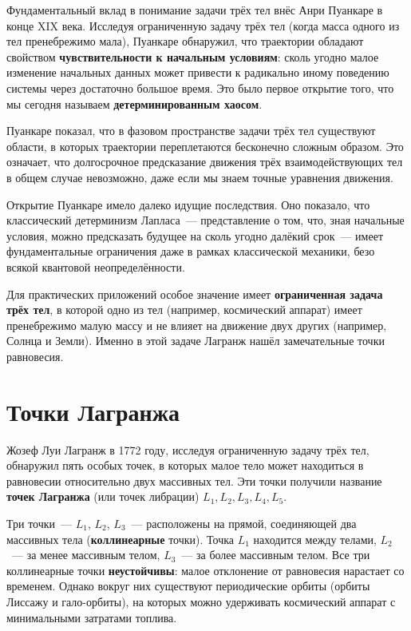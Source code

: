 \documentclass[12pt,a4paper]{article}
\begin{document}
Фундаментальный вклад в понимание задачи трёх тел внёс Анри Пуанкаре в
конце XIX века. Исследуя ограниченную задачу трёх тел (когда масса одного
из тел пренебрежимо мала), Пуанкаре обнаружил, что траектории обладают
свойством \textbf{чувствительности к начальным условиям}: сколь угодно малое
изменение начальных данных может привести к радикально иному поведению
системы через достаточно большое время. Это было первое открытие того, что
мы сегодня называем \textbf{детерминированным хаосом}.

Пуанкаре показал, что в фазовом пространстве задачи трёх тел существуют
области, в которых траектории переплетаются бесконечно сложным образом.
Это означает, что долгосрочное предсказание движения трёх взаимодействующих
тел в общем случае невозможно, даже если мы знаем точные уравнения движения.

Открытие Пуанкаре имело далеко идущие последствия. Оно показало, что
классический детерминизм Лапласа~--- представление о том, что, зная
начальные условия, можно предсказать будущее на сколь угодно далёкий
срок~--- имеет фундаментальные ограничения даже в рамках классической
механики, безо всякой квантовой неопределённости.

Для практических приложений особое значение имеет \textbf{ограниченная задача
трёх тел}, в которой одно из тел (например, космический аппарат) имеет
пренебрежимо малую массу и не влияет на движение двух других (например,
Солнца и Земли). Именно в этой задаче Лагранж нашёл замечательные точки
равновесия.

\section{Точки Лагранжа}

Жозеф Луи Лагранж в 1772 году, исследуя ограниченную задачу трёх тел,
обнаружил пять особых точек, в которых малое тело может находиться в
равновесии относительно двух массивных тел. Эти точки получили название
\textbf{точек Лагранжа} (или точек либрации) $L_1, L_2, L_3, L_4, L_5$.

Три точки~--- $L_1$, $L_2$, $L_3$~--- расположены на прямой, соединяющей
два массивных тела (\textbf{коллинеарные} точки). Точка $L_1$ находится между
телами, $L_2$~--- за менее массивным телом, $L_3$~--- за более массивным
телом. Все три коллинеарные точки \textbf{неустойчивы}: малое отклонение
от равновесия нарастает со временем. Однако вокруг них существуют
периодические орбиты (орбиты Лиссажу и гало-орбиты), на которых можно
удерживать космический аппарат с минимальными затратами топлива.
\end{document}
